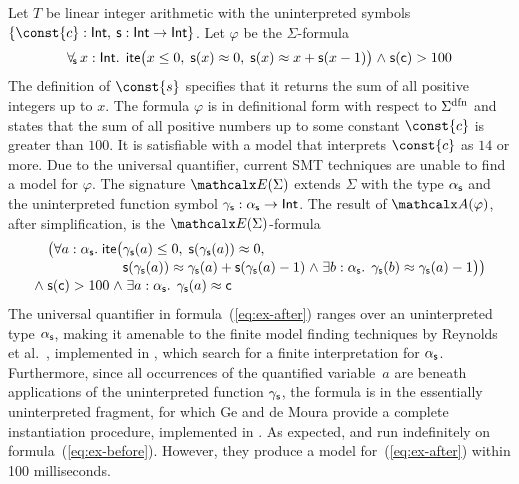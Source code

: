 \begin{example}
\label{ex:translation}
Let $T$ be linear integer arithmetic
with the uninterpreted symbols  $\{ \const{c} : { \typeint },\allowbreak\> \con{s} : { \typeint \rightarrow \typeint } \}$.
Let $\varphi$ be the $\Sigma$-formula
\begin{equation} \label{eq:ex-before}
\forallf{\con{s}} x : {\typeint}.\;\, \lite\bigl( x \leq 0,\; \con{s}(x) \teq 0,\;
  \con{s}( x ) \teq x + \con{s}( x - 1 ) \bigr) \wedge \con{s}( \con{c} ) > 100
\end{equation}
%
The definition of $\const{s}$ specifies that it returns the sum of all
positive integers up to $x$. The formula $\varphi$ is in definitional form with
respect to $\sfundefs{\Sigma}$
and states that the sum of all
positive numbers up to some constant $\const{c}$ is greater than $100$. It is
satisfiable with a model that interprets $\const{c}$ as $14$ or more.
Due to the universal quantifier,
current SMT techniques
are unable to find
a model for $\varphi$. The signature $\extendsig{\Sigma}$ extends $\Sigma$ with the type
$\alpha_{\mathsf{s}}$ and the uninterpreted function symbol $\gamma_{\mathsf{s}} : \alpha_{\mathsf{s}}
\rightarrow \mathsf{Int}$. The result of $\conv( \varphi )$, after simplification,
is the $\extendsig{\Sigma}$-formula
%
\begin{equation} \label{eq:ex-after}
\!\begin{aligned}[c]
  & \phantom{{\wedge}\; }\bigl(
      \forall a : \fargtype{\con{s}}.\; \lite\bigl(
        \!\begin{aligned}[t]
         &  \farg{\con{s}}( a ) \leq 0,\;
          \con{s}(\farg{\con{s}}( a )) \teq 0,\;
\\[-\jot]
  & \con{s}(\farg{\con{s}}( a )) \teq \farg{\con{s}}( a ) + \con{s}( \farg{\con{s}}( a )-1 )
    \wedge \exists b : {\fargtype{\con{s}}}.\;\, \farg{\con{s}}( b ) \teq \farg{\con{s}}( a )-1 \bigr) \bigr)
\end{aligned}
\\[-\jot]
 & {\wedge}\; \con{s}( \con{c} ) > 100 \wedge \exists a : {\fargtype{\con{s}}}.\;\, \farg{\con{s}}( a ) \teq \con{c}
\end{aligned}
\end{equation}
%
The universal quantifier in formula~(\ref{eq:ex-after}) ranges over an uninterpreted
type $\alpha_{\mathsf{s}}$, making it amenable to the finite model finding
techniques by Reynolds et al.\ \cite{ReyEtAl-1-RR-13,reynolds-et-al-2013},
implemented in \cvc, which search for a finite interpretation for $\alpha_{\mathsf{s}}$.
Furthermore, since all occurrences of the quantified variable~$a$ are
beneath applications of the uninterpreted function $\gamma_{\mathsf{s}}$,
the formula is in the essentially uninterpreted fragment,
for which Ge and de Moura \cite{GeDeM-CAV-09} provide
a complete instantiation procedure, implemented in \ziii.
As expected, \cvc and \ziii run indefinitely on formula~(\ref{eq:ex-before}).
However, they produce a model for~(\ref{eq:ex-after})
within 100 milliseconds.\xend
\end{example}

